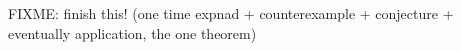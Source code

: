 
FIXME: finish this! (one time expnad + counterexample + conjecture + eventually application, the one theorem)

